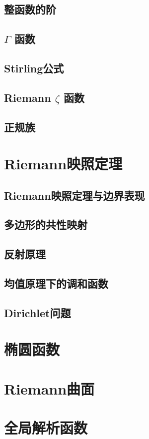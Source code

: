 \documentclass[UTF8]{ctexart}
\begin{document}
\subsection{整函数的阶}
\subsection{ \( \Gamma \) 函数}
\subsection{Stirling公式}
\subsection{Riemann  \( \zeta \)  函数}
\subsection{正规族}
\section{Riemann映照定理}
\subsection{Riemann映照定理与边界表现}
\subsection{多边形的共性映射}
\subsection{反射原理}
\subsection{均值原理下的调和函数}
\subsection{Dirichlet问题}
\section{椭圆函数}
\section{Riemann曲面}
\section{全局解析函数}
\end{document}
